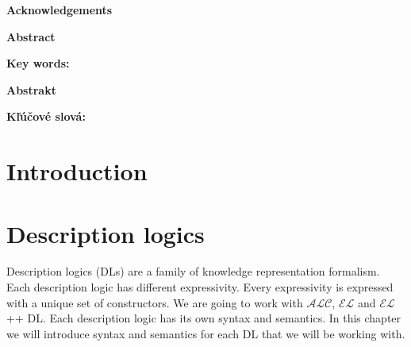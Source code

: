 \documentclass[12pt,a4paper]{article}
\newcommand{\textoverline}[1]{{\setul{-5em}{}$\overline{\mbox{#1}}$}}
\begin{document}
\pagebreak

\justify


\pagebreak
\thispagestyle{empty}
\par\vspace*{15cm}
{\large\bf Acknowledgements \newline \par}

\pagebreak
\thispagestyle{empty}
{\large\bf Abstract \newline \par} 

\textbf{Key words:}

\pagebreak
\thispagestyle{empty}
{\large\bf Abstrakt \newline \par} 

\textbf{Kľúčové slová:}

\pagebreak
\thispagestyle{empty}
\tableofcontents
\thispagestyle{empty}

\pagebreak
\thispagestyle{empty}
\listoffigures

\pagebreak
\setcounter{page}{1}
\section*{Introduction}


\pagebreak
\section{Description logics}
Description logics (DLs) are a family of knowledge representation formalism. Each description logic has different expressivity. Every expressivity is expressed with a unique set of constructors. We are going to work with $\mathcal{ALC}$, $\mathcal{EL}$ and $\mathcal{EL}${+}{+} DL. Each description logic has its own syntax and semantics. In this chapter we will introduce syntax and semantics \citep{Rudolph2011} for each DL that we will be working with.
\end{document}
